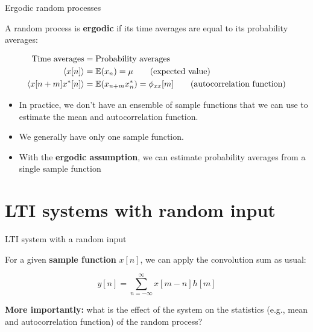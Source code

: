 \documentclass[10pt]{beamer}
\begin{document}
\begin{frame}{Ergodic random processes}

A random process is \textbf{ergodic} if its time averages are equal to its probability averages:

\begin{align*}
\text{Time averages} &= \text{Probability averages} \\
\langle x[n] \rangle &= \operatorname{\mathbb{E}}(x_n) = \mu \tag{expected value} \\
\langle x[n+m]x^*[n] \rangle &= \operatorname{\mathbb{E}}(x_{n+m}x_n^*) = \phi_{xx}[m] \tag{autocorrelation function}
\end{align*}

\begin{itemize}
	\pause\item In practice, we don't have an ensemble of sample functions that we can use to estimate the mean and autocorrelation function.
	\pause\item We generally have only one sample function.
	\pause\item With the \textbf{ergodic assumption}, we can estimate probability averages from a single sample function
\end{itemize}

\end{frame}

%
\section{LTI systems with random input}
\begin{frame}{LTI system with a random input}
\begin{center}
\resizebox{\linewidth}{!}{}
\end{center}

\pause
For a given \textbf{sample function} $x[n]$, we can apply the convolution sum as usual:

\begin{equation*}
y[n] = \sum_{n=-\infty}^{\infty} x[m-n]h[m] 
\end{equation*}

\pause\textbf{More importantly:} what is the effect of the system on the statistics (e.g., mean and autocorrelation function) of the random process?

\end{frame}
\end{document}
